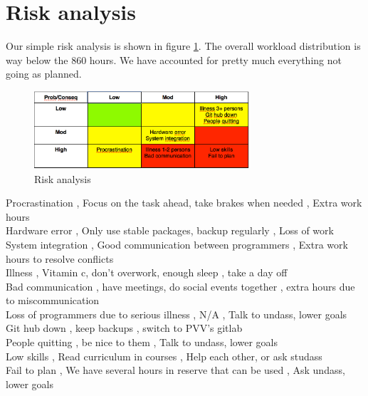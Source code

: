 \documentclass[a4paper, english, 12pt]{article}
\begin{document}
\section{Risk analysis}
Our simple risk analysis is shown in figure \ref{risk}. The overall workload distribution is way below the $860$ hours. We have accounted for pretty much everything not going as planned. 
\begin{figure}[h!] %
    \begin{center} %
    	\includegraphics[width=8cm]{Risikoanalyse.png}
		\caption{Risk analysis}
	\label{risk}
	\end{center}
\end{figure}

                Procrastination , Focus on the task ahead, take brakes when needed , Extra work hours \\
        Hardware error , Only use stable packages, backup regularly , Loss of work \\
        System integration , Good communication between programmers , Extra work hours to resolve conflicts \\
        Illness , Vitamin c, don't overwork, enough sleep , take a day off\\
        Bad communication , have meetings, do social events together , extra hours due to miscommunication \\
        Loss of programmers due to serious illness , N/A , Talk to undass, lower goals \\
        Git hub down , keep backups , switch to PVV's gitlab \\
        People quitting , be nice to them , Talk to undass, lower goals\\
        Low skills , Read curriculum in courses , Help each other, or ask studass \\
        Fail to plan , We have several hours in reserve that can be used , Ask undass, lower goals\\
        
\end{document}

